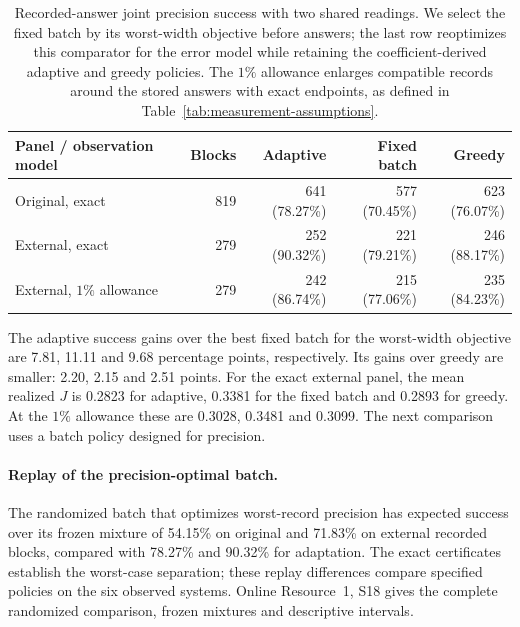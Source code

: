 \documentclass[12pt]{article}
\begin{document}
\begin{table}[t]
\centering\small
\begin{tabular}{lrrrr}
\toprule
Panel / observation model & Blocks & Adaptive & Fixed batch & Greedy\\
\midrule
Original, exact &819&641 (78.27\%)&577 (70.45\%)&623 (76.07\%)\\
External, exact &279&252 (90.32\%)&221 (79.21\%)&246 (88.17\%)\\
External, $1\%$ allowance &279&242 (86.74\%)&215 (77.06\%)&235 (84.23\%)\\
\bottomrule
\end{tabular}
\caption{Recorded-answer joint precision success with two shared readings.
We select the fixed batch by its worst-width objective before answers;
the last row reoptimizes this comparator for the error model while retaining
the coefficient-derived adaptive and greedy policies. The $1\%$ allowance
enlarges compatible records around the stored answers with exact endpoints,
as defined in Table~\ref{tab:measurement-assumptions}.}
\label{tab:joint_shared_replay}
\end{table}

The adaptive success gains over the best fixed batch for the worst-width objective are
7.81, 11.11 and 9.68 percentage points, respectively. Its gains over greedy
are smaller: 2.20, 2.15 and 2.51 points. For the exact external panel, the
mean realized $J$ is 0.2823 for adaptive, 0.3381 for the fixed batch and
0.2893 for greedy. At the $1\%$ allowance these are 0.3028, 0.3481 and
0.3099. The next comparison uses a batch policy designed for precision.

\paragraph{Replay of the precision-optimal batch.}
The randomized batch that optimizes worst-record precision has expected
success over its frozen mixture of 54.15\% on original and 71.83\% on external
recorded blocks, compared with 78.27\% and 90.32\% for adaptation.
The exact certificates establish the
worst-case separation; these replay differences compare specified policies
on the six observed systems. Online Resource~1, S18 gives the complete
randomized comparison, frozen mixtures and descriptive intervals.
\end{document}
